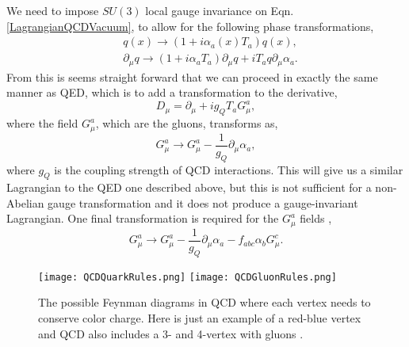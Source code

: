 We need to impose $SU(3)$ local gauge invariance on Eqn. \ref{LagrangianQCDVacuum}, to allow for the following phase transformations,
\begin{equation}
\begin{split}
& q(x)\rightarrow(1+i\alpha_a(x)T_a)q(x), \\
& \partial_\mu q\rightarrow(1+i\alpha_aT_a)\partial_\mu q+iT_aq\partial_\mu\alpha_a.
\end{split}
\end{equation}
From this is seems straight forward that we can proceed in exactly the same manner as QED, which is to add a transformation to the derivative,
\begin{equation}
D_\mu=\partial_\mu+ig_Q T_aG_\mu^a,
\end{equation}
where the field $G_\mu^a$, which are the gluons, transforms as, 
\begin{equation}
G_\mu^a\rightarrow G_\mu^a-\frac{1}{g_Q}\partial_\mu\alpha_a,
\end{equation}
where $g_Q$ is the coupling strength of QCD interactions. This will give us a similar Lagrangian to the QED one described above, but this is not sufficient for a non-Abelian gauge transformation and it does not produce a gauge-invariant Lagrangian. One final transformation is required for the $G_\mu^a$ fields \cite{peskin_introduction_1995}, 
\begin{equation}\label{QCDGaugeTransform}
G_\mu^a\rightarrow G_\mu^a-\frac{1}{g_Q}\partial_\mu\alpha_a-f_{abc}\alpha_b G_\mu^c.
\end{equation}

\begin{figure}[!htb]
	  \texttt{[image: QCDQuarkRules.png]}
	\endminipage\hfill
	  \texttt{[image: QCDGluonRules.png]}
	\endminipage\hfill
	\caption[QCD Feynman Diagrams]{The possible Feynman diagrams in QCD where each vertex needs to conserve color charge. Here is just an example of a red-blue vertex and QCD also includes a 3- and 4-vertex with gluons \cite{griffiths_introduction_2008}.}
 	\label{QCDRules} 
\end{figure}

